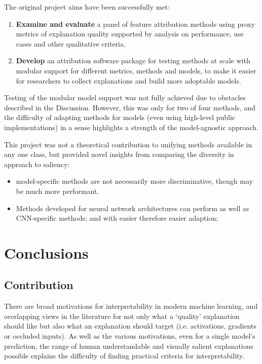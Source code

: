 \documentclass[main]{subfiles}
\begin{document}
The original project aims have been successfully met:
\begin{enumerate}
	\item \textbf{Examine and evaluate} a panel of feature attribution methods using proxy metrics of explanation quality supported by analysis on performance, use cases and other qualitative criteria.

	\item \textbf{Develop} an attribution software package for testing methods at scale with modular support for different metrics, methods and models, to make it easier for researchers to collect explanations and build more adoptable models.

\end{enumerate}
Testing of the modular model support was not fully achieved due to obstacles described in the Discussion. However, this was only for two of four methods, and the difficulty of adapting methods for models (even using high-level public implementations) in a sense highlights a strength of the model-agnostic approach.

This project was not a theoretical contribution to unifying methods available in any one class, but provided novel insights from comparing the diversity in approach to saliency:

\begin{itemize}
\item model-specific methods are not necessarily more discriminative, though may be much more performant.
\item Methods developed for neural network architectures can perform as well as CNN-specific methods; and with easier therefore easier adaption;
\end{itemize}


\chapter{Conclusions}

\section{Contribution}
There are broad motivations for interpretability in modern machine learning, and overlapping views in the literature for not only what a `quality' explanation should like but also what an explanation should target (i.e. activations, gradients or occluded inputs). As well as the various motivations, even for a single model's prediction, the range of human understandable and visually salient explanations possible  explains the difficulty of finding practical criteria for interpretability.
\end{document}
